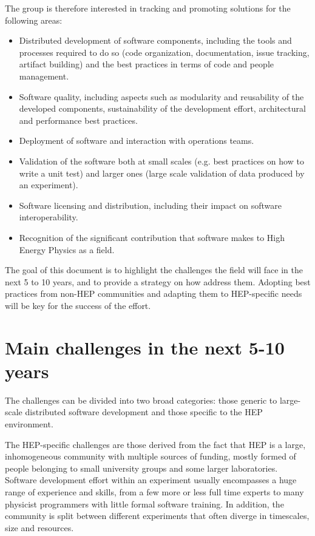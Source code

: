 \documentclass[12pt,a4paper]{article}
\begin{document}
The group is therefore interested in tracking and promoting solutions
for the following areas:

\begin{itemize}
\item
    Distributed development of software components, including the tools
  and processes required to do so (code organization, documentation,
  issue tracking, artifact building) and the best practices in terms of
  code and people management.
  \item
    Software quality, including aspects such as modularity and reusability
  of the developed components, sustainability of the development effort,
  architectural and performance best practices.
  \item
    Deployment of software and interaction with operations teams.
  \item
    Validation of the software both at small scales (e.g. best practices
  on how to write a unit test) and larger ones (large scale validation
  of data produced by an experiment).
  \item
    Software licensing and distribution, including their impact on
  software interoperability.
  \item
    Recognition of the significant contribution that software makes to
  High Energy Physics as a field.
  \end{itemize}

The goal of this document is to highlight the challenges the field will
face in the next 5 to 10 years, and to provide a strategy on how address
them. Adopting best practices from non-HEP communities and adapting them
to HEP-specific needs will be key for the success of the effort.

\hypertarget{main-challenges-in-the-next-5-10-years}{%
\section{Main challenges in the next 5-10
years}\label{main-challenges-in-the-next-5-10-years}}

The challenges can be divided into two broad categories: those generic
to large-scale distributed software development and those specific to
the HEP environment.

The HEP-specific challenges are those derived from the fact that HEP is
a large, inhomogeneous community with multiple sources of funding,
mostly formed of people belonging to small university groups and some
larger laboratories. Software development effort within an experiment
usually encompasses a huge range of experience and skills, from a few
more or less full time experts to many physicist programmers with little
formal software training. In addition, the community is split between
different experiments that often diverge in timescales, size and
resources.
\end{document}
